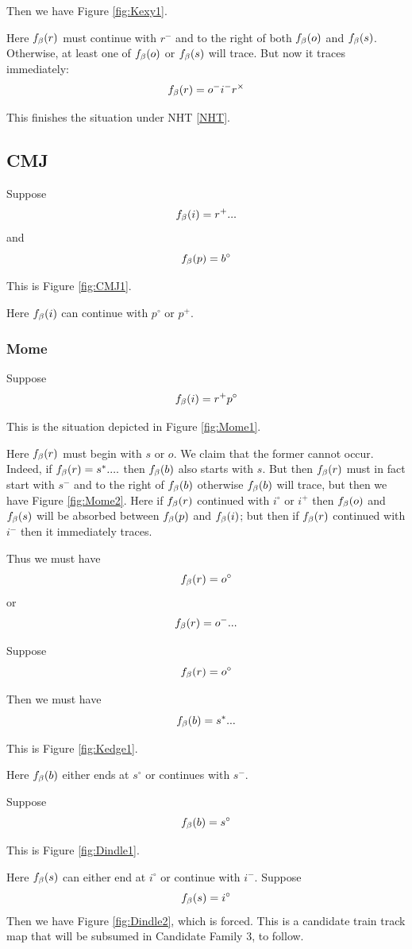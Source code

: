 Then we have Figure \ref{fig:Kexy1}.

Here $f_\beta(r)$ must continue with $r^-$ and to the right of both $f_\beta(o)$ and $f_\beta(s)$. Otherwise, at least one of $f_\beta(o)$ or $f_\beta(s)$ will trace. But now it traces immediately:
$$f_\beta(r) = o^- i^- r^\times$$

This finishes the situation under NHT \ref{NHT}.

\subsection{CMJ}\label{CMJ}
Suppose
$$f_\beta(i) = r^+...$$
and
$$f_\beta(p) = b^\circ$$

This is Figure \ref{fig:CMJ1}.

Here $f_\beta(i)$ can continue with $p^\circ$ or $p^+$.

\subsubsection{Mome}\label{Mome}
Suppose
$$f_\beta(i) = r^+ p^\circ$$

This is the situation depicted in Figure \ref{fig:Mome1}.

Here $f_\beta(r)$ must begin with $s$ or $o$. We claim that the former cannot occur. Indeed, if $f_\beta(r) = s^*....$ then $f_\beta(b)$ also starts with $s$. But then $f_\beta(r)$ must in fact start with $s^-$ and to the right of $f_\beta(b)$ otherwise $f_\beta(b)$ will trace, but then we have Figure \ref{fig:Mome2}. Here if $f_\beta(r)$ continued with $i^\circ$ or $i^+$ then $f_\beta(o)$ and $f_\beta(s)$ will be absorbed between $f_\beta(p)$ and $f_\beta(i)$; but then if $f_\beta(r)$ continued with $i^-$ then it immediately traces.

Thus we must have 
$$f_\beta(r) = o^\circ$$
or
$$f_\beta(r) = o^-...$$

\label{Kedge}
Suppose
$$f_\beta(r) = o^\circ$$

Then we must have
$$f_\beta(b) = s^*...$$

This is Figure \ref{fig:Kedge1}.

Here $f_\beta(b)$ either ends at $s^\circ$ or continues with $s^-$.

\label{Dindle}
Suppose
$$f_\beta(b) = s^\circ$$

This is Figure \ref{fig:Dindle1}.

Here $f_\beta(s)$ can either end at $i^\circ$ or continue with $i^-$. Suppose
$$f_\beta(s) = i^\circ$$
Then we have Figure \ref{fig:Dindle2}, which is forced. This is a candidate train track map that will be subsumed in Candidate Family 3, to follow.

